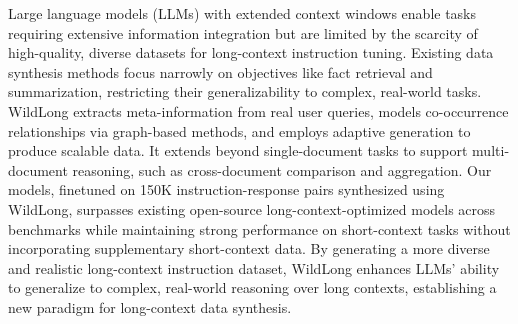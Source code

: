 Large language models (LLMs) with extended context windows enable tasks requiring extensive information integration but are limited by the scarcity of high-quality, diverse datasets for long-context instruction tuning. Existing data synthesis methods focus narrowly on objectives like fact retrieval and summarization, restricting their generalizability to complex, real-world tasks.
WildLong extracts meta-information from real user queries, models co-occurrence relationships via graph-based methods, and employs adaptive generation to produce scalable data. It extends beyond single-document tasks to support multi-document reasoning, such as cross-document comparison and aggregation.
Our models, finetuned on 150K instruction-response pairs synthesized using WildLong, surpasses existing open-source long-context-optimized models across benchmarks while maintaining strong performance on short-context tasks without incorporating supplementary short-context data.
By generating a more diverse and realistic long-context instruction dataset, WildLong enhances LLMs' ability to generalize to complex, real-world reasoning over long contexts, establishing a new paradigm for long-context data synthesis.